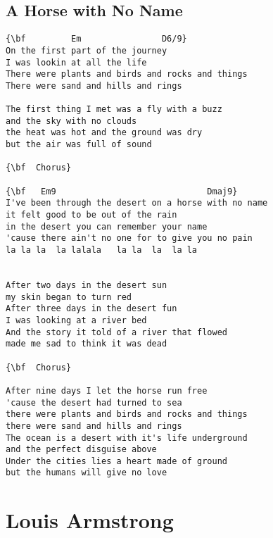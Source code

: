 \documentclass[a4paper]{article}
\begin{document}
\subsection{A Horse with No Name}
\begin{Verbatim}[commandchars=\\\{\}]
{\bf         Em                D6/9}
On the first part of the journey
I was lookin at all the life
There were plants and birds and rocks and things
There were sand and hills and rings

The first thing I met was a fly with a buzz
and the sky with no clouds
the heat was hot and the ground was dry
but the air was full of sound

{\bf  Chorus}

{\bf   Em9                              Dmaj9}
I've been through the desert on a horse with no name
it felt good to be out of the rain
in the desert you can remember your name
'cause there ain't no one for to give you no pain
la la la  la lalala   la la  la  la la


After two days in the desert sun
my skin began to turn red
After three days in the desert fun
I was looking at a river bed
And the story it told of a river that flowed
made me sad to think it was dead

{\bf  Chorus}

After nine days I let the horse run free
'cause the desert had turned to sea
there were plants and birds and rocks and things
there were sand and hills and rings
The ocean is a desert with it's life underground
and the perfect disguise above
Under the cities lies a heart made of ground
but the humans will give no love

\end{Verbatim}
\newpage
\section{Louis Armstrong}
\end{document}

